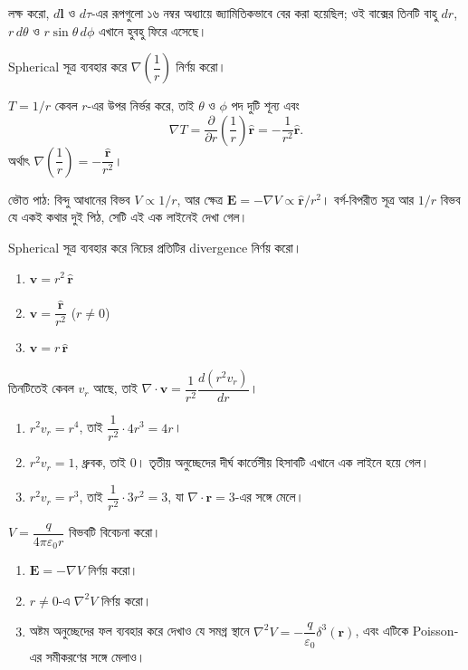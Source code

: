\documentclass[11pt]{article}
\begin{document}
লক্ষ করো, $d\mathbf{l}$ ও $d\tau$-এর রূপগুলো ১৬ নম্বর অধ্যায়ে
জ্যামিতিকভাবে বের করা হয়েছিল; ওই বাক্সের তিনটি বাহু $dr$, $r\,d\theta$ ও
$r\sin\theta\,d\phi$ এখানে হুবহু ফিরে এসেছে।

\begin{example}
Spherical সূত্র ব্যবহার করে $\nabla\left( \dfrac{1}{r} \right)$ নির্ণয় করো।
\end{example}

\begin{solbox}
$T = 1/r$ কেবল $r$-এর উপর নির্ভর করে, তাই $\theta$ ও $\phi$ পদ দুটি শূন্য
এবং
\[
  \nabla T = \frac{\partial}{\partial r}\left( \frac{1}{r} \right)
  \hat{\mathbf{r}} = -\frac{1}{r^{2}}\hat{\mathbf{r}} .
\]
অর্থাৎ $\nabla\left( \dfrac{1}{r} \right) =
-\dfrac{\hat{\mathbf{r}}}{r^{2}}$।

ভৌত পাঠ: বিন্দু আধানের বিভব $V \propto 1/r$, আর ক্ষেত্র
$\mathbf{E} = -\nabla V \propto \hat{\mathbf{r}}/r^{2}$। বর্গ-বিপরীত সূত্র
আর $1/r$ বিভব যে একই কথার দুই পিঠ, সেটি এই এক লাইনেই দেখা গেল।
\end{solbox}

 Spherical সূত্র ব্যবহার করে নিচের প্রতিটির divergence নির্ণয় করো।
\begin{enumerate}
  \item $\mathbf{v} = r^{2}\,\hat{\mathbf{r}}$
  \item $\mathbf{v} = \dfrac{\hat{\mathbf{r}}}{r^{2}}$ ($r \neq 0$)
  \item $\mathbf{v} = r\,\hat{\mathbf{r}}$
\end{enumerate}

\begin{sol}
তিনটিতেই কেবল $v_{r}$ আছে, তাই
$\nabla\cdot\mathbf{v} = \dfrac{1}{r^{2}}\dfrac{d\left( r^{2}v_{r}
\right)}{dr}$।
\begin{enumerate}
  \item $r^{2}v_{r} = r^{4}$, তাই
        $\dfrac{1}{r^{2}}\cdot 4r^{3} = 4r$।
  \item $r^{2}v_{r} = 1$, ধ্রুবক, তাই $0$। তৃতীয় অনুচ্ছেদের দীর্ঘ
        কার্তেসীয় হিসাবটি এখানে এক লাইনে হয়ে গেল।
  \item $r^{2}v_{r} = r^{3}$, তাই
        $\dfrac{1}{r^{2}}\cdot 3r^{2} = 3$, যা
        $\nabla\cdot\mathbf{r} = 3$-এর সঙ্গে মেলে।
\end{enumerate}
\end{sol}

 $V = \dfrac{q}{4\pi\varepsilon_{0}r}$ বিভবটি বিবেচনা করো।
\begin{enumerate}
  \item $\mathbf{E} = -\nabla V$ নির্ণয় করো।
  \item $r \neq 0$-এ $\nabla^{2}V$ নির্ণয় করো।
  \item অষ্টম অনুচ্ছেদের ফল ব্যবহার করে দেখাও যে সমগ্র স্থানে
        $\nabla^{2}V = -\dfrac{q}{\varepsilon_{0}}\delta^{3}(\mathbf{r})$,
        এবং এটিকে Poisson-এর সমীকরণের সঙ্গে মেলাও।
\end{enumerate}
\end{document}
